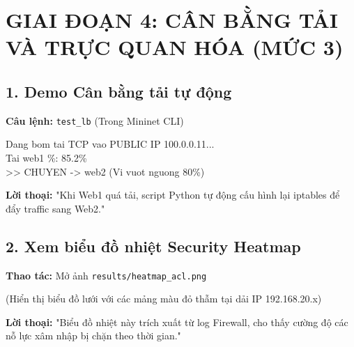 \documentclass[12pt,a4paper]{article}
\begin{document}
\section{GIAI ĐOẠN 4: CÂN BẰNG TẢI VÀ TRỰC QUAN HÓA (MỨC 3)}

\subsection{1. Demo Cân bằng tải tự động}
\textbf{Câu lệnh:} \texttt{test_lb} (Trong Mininet CLI)
\begin{expectedoutput}
[SIM] Dang bom tai TCP vao PUBLIC IP 100.0.0.11... \\
Tai web1 \%: 85.2\% \\
>> CHUYEN -> web2 (Vi vuot nguong 80\%)
\end{expectedoutput}
\textbf{Lời thoại: } "Khi Web1 quá tải, script Python tự động cấu hình lại iptables để đẩy traffic sang Web2."

\subsection{2. Xem biểu đồ nhiệt Security Heatmap}
\textbf{Thao tác: } Mở ảnh \texttt{results/heatmap_acl.png}
\begin{expectedoutput}
(Hiển thị biểu đồ lưới với các mảng màu đỏ thẫm tại dải IP 192.168.20.x)
\end{expectedoutput}
\textbf{Lời thoại: } "Biểu đồ nhiệt này trích xuất từ log Firewall, cho thấy cường độ các nỗ lực xâm nhập bị chặn theo thời gian."
\end{document}
